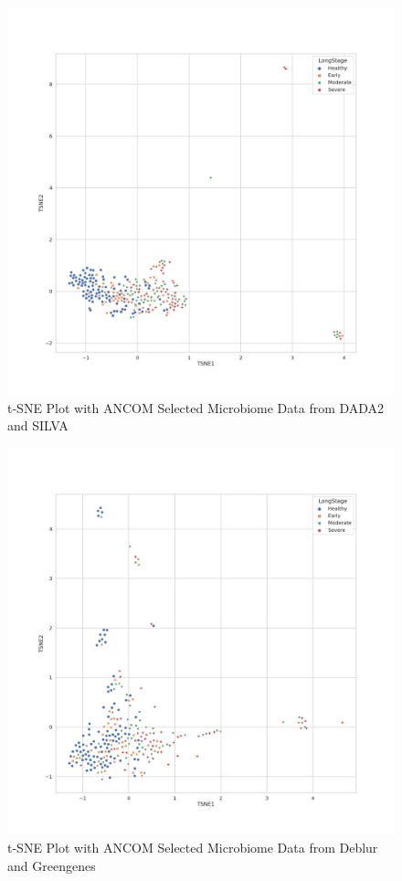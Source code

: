\documentclass[a4paper]{article}
\begin{document}
            \begin{figure}[p]
                \centering
                \includegraphics[width=0.6 \linewidth]{figures/tSNE/ANCOM/ANCOM.DADA2.silva.png}
                \caption{t-SNE Plot with ANCOM Selected Microbiome Data from DADA2 and SILVA}
                \label{fig:tsne-ANCOM-dada2-silva}
            \end{figure}

            \begin{figure}[p]
                \centering
                \includegraphics[width=0.6 \linewidth]{figures/tSNE/ANCOM/ANCOM.Deblur.gg.png}
                \caption{t-SNE Plot with ANCOM Selected Microbiome Data from Deblur and Greengenes}
                \label{fig:tsne-ANCOM-deblur-gg}
            \end{figure}
\end{document}
